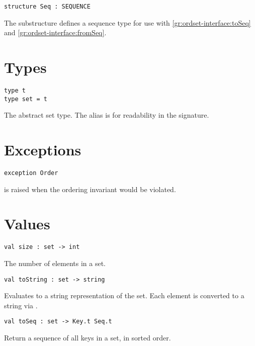 \begin{gram}
\begin{verbatim}
structure Seq : SEQUENCE
\end{verbatim}
The  substructure defines a sequence type for use with
\ref{gr:ordset-interface:toSeq} and \ref{gr:ordset-interface:fromSeq}.
\end{gram}


\section{Types}

\begin{gram}
\begin{verbatim}
type t
type set = t
\end{verbatim}
The abstract set type. The alias  is for readability in the
signature.
\end{gram}


\section{Exceptions}

\begin{gram}
\begin{verbatim}
exception Order
\end{verbatim}
 is raised when the ordering invariant would be violated.
\end{gram}


\section{Values}

\begin{gram}[size]
\begin{verbatim}
val size : set -> int
\end{verbatim}
The number of elements in a set.
\end{gram}

\begin{gram}[toString]
\begin{verbatim}
val toString : set -> string
\end{verbatim}
Evaluates to a string representation of the set. Each element is converted to
a string via .
\end{gram}

\begin{gram}[toSeq]
\label{gr:ordset-interface:toSeq}
\begin{verbatim}
val toSeq : set -> Key.t Seq.t
\end{verbatim}
Return a sequence of all keys in a set, in sorted order.
\end{gram}

